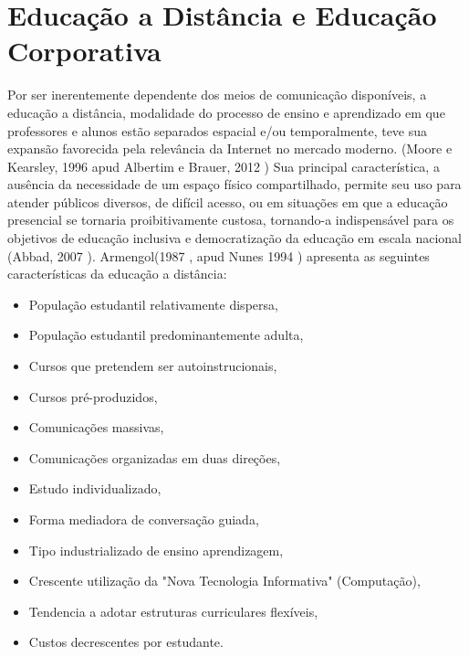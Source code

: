 \chapter{Educação a Distância e Educação Corporativa}


Por ser inerentemente dependente dos meios de comunicação disponíveis, a educação a distância, modalidade do processo de ensino e aprendizado em que professores e alunos estão separados espacial e/ou temporalmente, teve sua expansão favorecida pela relevância da Internet no mercado moderno. (Moore e Kearsley, 1996 \cite{Moore_Kearsley_1996} apud Albertim e Brauer, 2012 \cite{Albertin_Brauer_2012}) Sua principal característica, a ausência da necessidade de um espaço físico compartilhado, permite seu uso para atender públicos diversos, de difícil acesso, ou em situações em que a educação presencial se tornaria proibitivamente custosa, tornando-a indispensável para os objetivos de educação inclusiva e democratização da educação em escala nacional (Abbad, 2007 \cite{Abbad_2007}). Armengol(1987 \cite{Armengol_1987}, apud Nunes 1994 \cite{Nunes_1994}) apresenta as seguintes características da educação a distância:

\begin{itemize}
     
 \item População estudantil relativamente dispersa,
 \item População estudantil predominantemente adulta,
 \item Cursos que pretendem ser autoinstrucionais,
 \item Cursos pré-produzidos,
 \item Comunicações massivas,
 \item Comunicações organizadas em duas direções,
 \item Estudo individualizado,
 \item Forma mediadora de conversação guiada,
 \item Tipo industrializado de ensino aprendizagem,
 \item Crescente utilização da "Nova Tecnologia Informativa" (Computação),
 \item Tendencia a adotar estruturas curriculares flexíveis,
 \item Custos decrescentes por estudante.
 
\end{itemize}
 
